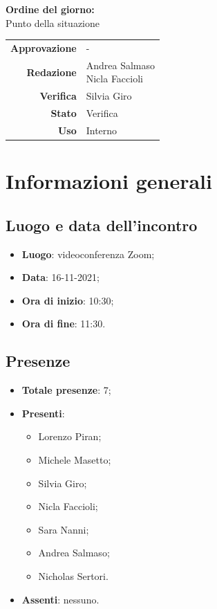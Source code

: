 \documentclass[11pt]{article}
\begin{document}
\begin{titlepage}
\begin{center}
			\large
			
			\vfill
			\textbf{Ordine del giorno:} \\
			Punto della situazione
			
			
			\vfill
			
			
			\begin{tabular}{r|l}
				\textbf{Approvazione} &  -\\
				\textbf{Redazione} &  \parbox[t]{3.5cm}{Andrea Salmaso\\ Nicla Faccioli}\\
				\textbf{Verifica} &  Silvia Giro\\
				\textbf{Stato} & Verifica \\
				\textbf{Uso} & Interno
			\end{tabular}
			\vfill
			
		\end{center}
	\end{titlepage}

	\section{Informazioni generali}
	\subsection{Luogo e data dell'incontro}
	\begin{itemize}
		\item \textbf{Luogo}: videoconferenza Zoom;
		\item \textbf{Data}: 16-11-2021;
		\item \textbf{Ora di inizio}: 10:30;
		\item \textbf{Ora di fine}: 11:30.
	\end{itemize}
	
	\subsection{Presenze}
	\begin{itemize}
		\item \textbf{Totale presenze}: 7;
		\item \textbf{Presenti}:
		\begin{itemize}
			\item Lorenzo Piran; 
			\item Michele Masetto;
			\item Silvia Giro;
			\item Nicla Faccioli;
			\item Sara Nanni;
			\item Andrea Salmaso;
			\item Nicholas Sertori.
		\end{itemize}
		\item \textbf{Assenti}: nessuno.
	\end{itemize}
\end{document}
